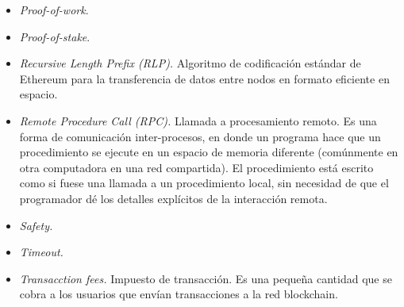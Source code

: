 \begin{itemize}
     \item \textit{Proof-of-work}.
     \item \textit{Proof-of-stake}.
     \item \textit{Recursive Length Prefix (RLP).} Algoritmo de codificación estándar de Ethereum para la transferencia de datos
     entre nodos en formato eficiente en espacio.
     \item \textit{Remote Procedure Call (RPC).} Llamada a procesamiento remoto. Es una forma de comunicación inter-procesos,
     en donde un programa hace que un procedimiento se ejecute en un espacio de memoria diferente (comúnmente en otra computadora
     en una red compartida). El procedimiento  está escrito como si fuese una llamada a un procedimiento local, sin necesidad de
     que el programador dé los detalles explícitos de la interacción remota.
     \item \textit{Safety.}
     \item \textit{Timeout.} 
     \item \textit{Transacction fees.} Impuesto de transacción. Es una pequeña cantidad que se cobra a los
     usuarios que envían transacciones a la red blockchain.  
\end{itemize}